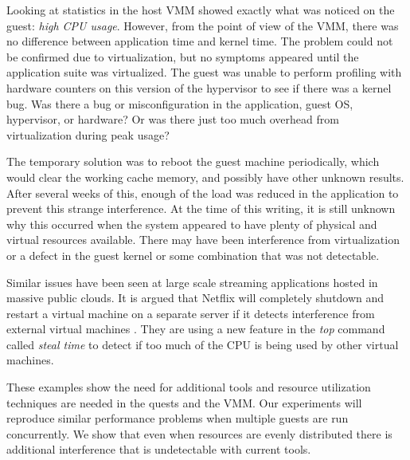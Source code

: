 \indent Looking at statistics in the host VMM showed exactly what was noticed on the guest:  \emph{high CPU usage}.   However, from the point of view of the VMM, there was no difference between application time and kernel time.  The problem could not be confirmed due to virtualization, but no symptoms appeared until the application suite was virtualized.  The guest was unable to perform profiling with hardware counters on this version of the hypervisor \cite{serebrin} to see if there was a kernel bug.  Was there a bug or misconfiguration in the application, guest OS, hypervisor, or hardware?  Or was there just too much overhead from virtualization during peak usage? 

\indent The temporary solution was to reboot the guest machine periodically, which would clear the working cache memory, and possibly have other unknown results.  After several weeks of this, enough of the load was reduced in the application to prevent this strange interference.  At the time of this writing, it is still unknown why this occurred when the system appeared to have plenty of physical and virtual resources available. There may have been interference from virtualization or a defect in the guest kernel or some combination that was not detectable. 

\indent Similar issues have been seen at large scale streaming applications hosted in massive public clouds.  
It is argued that Netflix will completely shutdown and restart a virtual machine on a separate server if it detects interference from external virtual machines \cite{netflix}. 
They are using a new feature in the \emph{top} command called \emph{steal time} to detect if too much of the CPU is being used by other virtual machines.

\indent These examples show the need for additional tools and resource utilization techniques are needed in the quests and the VMM.  
Our experiments will reproduce similar performance problems when multiple guests are run concurrently. 
We show that even when resources are evenly distributed there is additional interference that is undetectable with current tools. 

